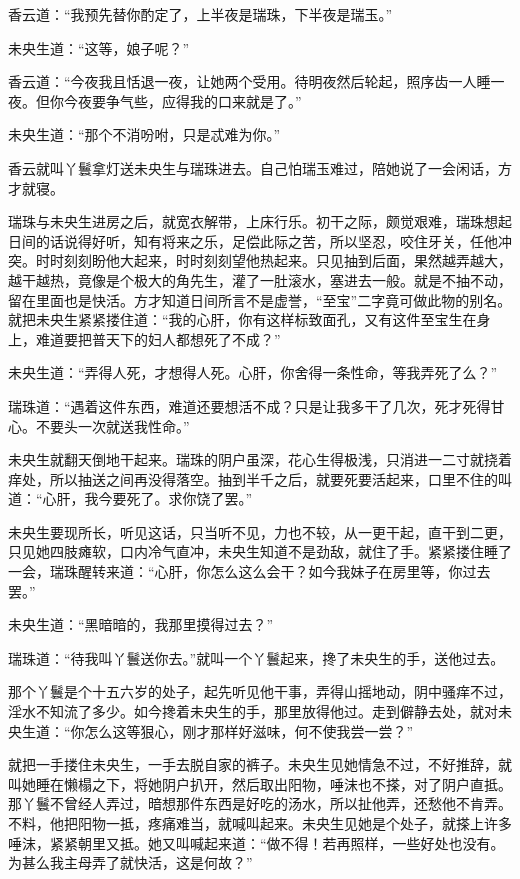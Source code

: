 \documentclass[a4paper,12pt,UTF8,twoside]{ctexbook}
\begin{document}
香云道：“我预先替你酌定了，上半夜是瑞珠，下半夜是瑞玉。”

未央生道：“这等，娘子呢？”

香云道：“今夜我且恬退一夜，让她两个受用。待明夜然后轮起，照序齿一人睡一夜。但你今夜要争气些，应得我的口来就是了。”

未央生道：“那个不消吩咐，只是忒难为你。”

香云就叫丫鬟拿灯送未央生与瑞珠进去。自己怕瑞玉难过，陪她说了一会闲话，方才就寝。

瑞珠与未央生进房之后，就宽衣解带，上床行乐。初干之际，颇觉艰难，瑞珠想起日间的话说得好听，知有将来之乐，足偿此际之苦，所以坚忍，咬住牙关，任他冲突。时时刻刻盼他大起来，时时刻刻望他热起来。只见抽到后面，果然越弄越大，越干越热，竟像是个极大的角先生，灌了一肚滚水，塞进去一般。就是不抽不动，留在里面也是快活。方才知道日间所言不是虚誉，“至宝”二字竟可做此物的别名。就把未央生紧紧搂住道：“我的心肝，你有这样标致面孔，又有这件至宝生在身上，难道要把普天下的妇人都想死了不成？”

未央生道：“弄得人死，才想得人死。心肝，你舍得一条性命，等我弄死了么？”

瑞珠道：“遇着这件东西，难道还要想活不成？只是让我多干了几次，死才死得甘心。不要头一次就送我性命。”

未央生就翻天倒地干起来。瑞珠的阴户虽深，花心生得极浅，只消进一二寸就挠着痒处，所以抽送之间再没得落空。抽到半千之后，就要死要活起来，口里不住的叫道：“心肝，我今要死了。求你饶了罢。”

未央生要现所长，听见这话，只当听不见，力也不较，从一更干起，直干到二更，只见她四肢瘫软，口内冷气直冲，未央生知道不是劲敌，就住了手。紧紧搂住睡了一会，瑞珠醒转来道：“心肝，你怎么这么会干？如今我妹子在房里等，你过去罢。”

未央生道：“黑暗暗的，我那里摸得过去？”

瑞珠道：“待我叫丫鬟送你去。”就叫一个丫鬟起来，搀了未央生的手，送他过去。

那个丫鬟是个十五六岁的处子，起先听见他干事，弄得山摇地动，阴中骚痒不过，淫水不知流了多少。如今搀着未央生的手，那里放得他过。走到僻静去处，就对未央生道：“你怎么这等狠心，刚才那样好滋味，何不使我尝一尝？”

就把一手搂住未央生，一手去脱自家的裤子。未央生见她情急不过，不好推辞，就叫她睡在懒榻之下，将她阴户扒开，然后取出阳物，唾沫也不搽，对了阴户直抵。那丫鬟不曾经人弄过，暗想那件东西是好吃的汤水，所以扯他弄，还愁他不肯弄。不料，他把阳物一抵，疼痛难当，就喊叫起来。未央生见她是个处子，就搽上许多唾沫，紧紧朝里又抵。她又叫喊起来道：“做不得！若再照样，一些好处也没有。为甚么我主母弄了就快活，这是何故？”
\end{document}
